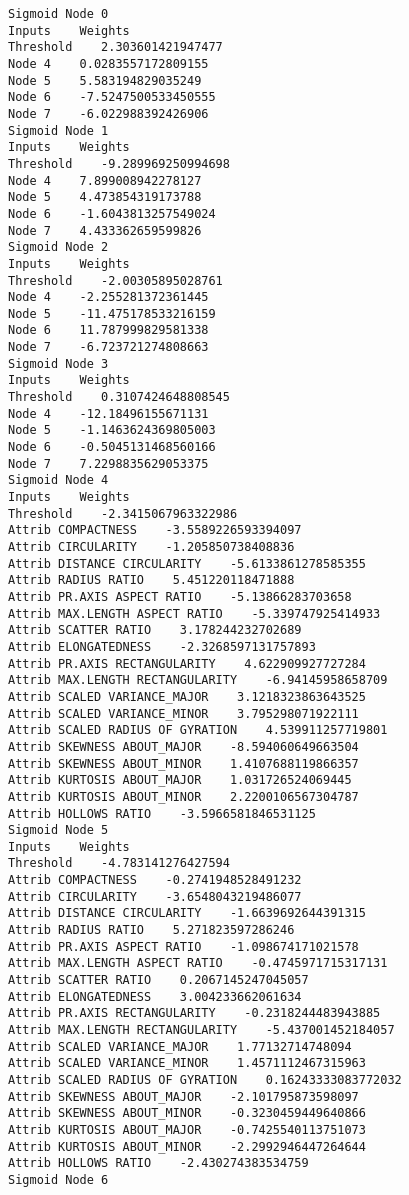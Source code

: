 \documentclass[
	article,			%
	11pt,				%
	oneside,			%
	a4paper,			%
	english,			%
	brazil,				%
	sumario=tradicional
	]{abntex2}
\begin{document}
\begin{lstlisting}
Sigmoid Node 0
Inputs    Weights
Threshold    2.303601421947477
Node 4    0.0283557172809155
Node 5    5.583194829035249
Node 6    -7.5247500533450555
Node 7    -6.022988392426906
Sigmoid Node 1
Inputs    Weights
Threshold    -9.289969250994698
Node 4    7.899008942278127
Node 5    4.473854319173788
Node 6    -1.6043813257549024
Node 7    4.433362659599826
Sigmoid Node 2
Inputs    Weights
Threshold    -2.00305895028761
Node 4    -2.255281372361445
Node 5    -11.475178533216159
Node 6    11.787999829581338
Node 7    -6.723721274808663
Sigmoid Node 3
Inputs    Weights
Threshold    0.3107424648808545
Node 4    -12.18496155671131
Node 5    -1.1463624369805003
Node 6    -0.5045131468560166
Node 7    7.2298835629053375
Sigmoid Node 4
Inputs    Weights
Threshold    -2.3415067963322986
Attrib COMPACTNESS    -3.5589226593394097
Attrib CIRCULARITY    -1.205850738408836
Attrib DISTANCE CIRCULARITY    -5.6133861278585355
Attrib RADIUS RATIO    5.451220118471888
Attrib PR.AXIS ASPECT RATIO    -5.13866283703658
Attrib MAX.LENGTH ASPECT RATIO    -5.339747925414933
Attrib SCATTER RATIO    3.178244232702689
Attrib ELONGATEDNESS    -2.3268597131757893
Attrib PR.AXIS RECTANGULARITY    4.622909927727284
Attrib MAX.LENGTH RECTANGULARITY    -6.94145958658709
Attrib SCALED VARIANCE_MAJOR    3.1218323863643525
Attrib SCALED VARIANCE_MINOR    3.795298071922111
Attrib SCALED RADIUS OF GYRATION    4.539911257719801
Attrib SKEWNESS ABOUT_MAJOR    -8.594060649663504
Attrib SKEWNESS ABOUT_MINOR    1.4107688119866357
Attrib KURTOSIS ABOUT_MAJOR    1.031726524069445
Attrib KURTOSIS ABOUT_MINOR    2.2200106567304787
Attrib HOLLOWS RATIO    -3.5966581846531125
Sigmoid Node 5
Inputs    Weights
Threshold    -4.783141276427594
Attrib COMPACTNESS    -0.2741948528491232
Attrib CIRCULARITY    -3.6548043219486077
Attrib DISTANCE CIRCULARITY    -1.6639692644391315
Attrib RADIUS RATIO    5.271823597286246
Attrib PR.AXIS ASPECT RATIO    -1.098674171021578
Attrib MAX.LENGTH ASPECT RATIO    -0.4745971715317131
Attrib SCATTER RATIO    0.2067145247045057
Attrib ELONGATEDNESS    3.004233662061634
Attrib PR.AXIS RECTANGULARITY    -0.2318244483943885
Attrib MAX.LENGTH RECTANGULARITY    -5.437001452184057
Attrib SCALED VARIANCE_MAJOR    1.77132714748094
Attrib SCALED VARIANCE_MINOR    1.4571112467315963
Attrib SCALED RADIUS OF GYRATION    0.16243333083772032
Attrib SKEWNESS ABOUT_MAJOR    -2.101795873598097
Attrib SKEWNESS ABOUT_MINOR    -0.3230459449640866
Attrib KURTOSIS ABOUT_MAJOR    -0.7425540113751073
Attrib KURTOSIS ABOUT_MINOR    -2.2992946447264644
Attrib HOLLOWS RATIO    -2.430274383534759
Sigmoid Node 6

\end{lstlisting}
\end{document}
